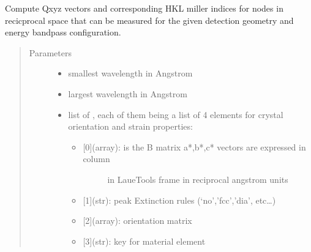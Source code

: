 \documentclass[letterpaper,10pt,english]{sphinxmanual}
\begin{document}

\begin{fulllineitems}
\label{\detokenize{Simulation_Module:LaueTools.lauecore.getLaueSpots}}
Compute Qxyz vectors and corresponding HKL miller indices for nodes in recicprocal space that can be measured
for the given detection geometry and energy bandpass configuration.
\begin{quote}\begin{description}
\item[{Parameters}] \leavevmode\begin{itemize}
\item {} 
 \textendash{} smallest wavelength in Angstrom

\item {} 
 \textendash{} largest wavelength in Angstrom

\item {} 
 \textendash{} 
list of , each of them being a list
of 4 elements for crystal orientation and strain properties:
\begin{itemize}
\item {} \begin{description}
\item[{{[}0{]}(array): is the B matrix a*,b*,c* vectors are expressed in column}] \leavevmode
in LaueTools frame in reciprocal angstrom units

\end{description}

\item {} 
{[}1{]}(str): peak Extinction rules (‘no’,’fcc’,’dia’, etc…)

\item {} 
{[}2{]}(array): orientation matrix

\item {} 
{[}3{]}(str): key for material element

\end{itemize}



\end{itemize}
\end{description}
\end{quote}
\end{fulllineitems}
\end{document}
